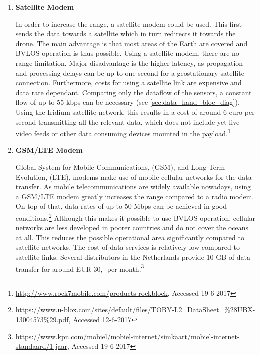 \begin{enumerate}
\item{\textbf{Satellite Modem}}

In order to increase the range, a satellite modem could be used. This first sends the data towards a satellite which in turn redirects it towards the drone. The main advantage is that most areas of the Earth are covered and BVLOS operation is thus possible. Using a satellite modem, there are no range limitation. Major disadvantage is the  higher latency, as propagation and processing delays can be up to one second for a geostationary satellite connection. Furthermore, costs for using a satellite link are expensive and data rate dependant. Comparing only the dataflow of the sensors, a constant flow of up to 55 kbps can be necessary (see \autoref{sec:data_hand_bloc_diag}). Using the Iridium satellite network, this results in a cost of around 6 euro per second transmitting all the relevant data, which does not include yet live video feeds or other data consuming devices mounted in the payload.\footnote{\url{http://www.rock7mobile.com/products-rockblock}, Accessed 19-6-2017}

\item{\textbf{GSM/LTE Modem}}

Global System for Mobile Communications, (GSM), and Long Term Evolution, (LTE), modems make use of mobile cellular networks for the data transfer. As mobile telecommunications are widely available nowadays, using a GSM/LTE modem greatly increases the range compared to a radio modem. On top of that, data rates of up to 50 Mbps can be achieved in good conditions.\footnote{\url{https://www.u-blox.com/sites/default/files/TOBY-L2_DataSheet_\%28UBX-13004573\%29.pdf}, Accessed 12-6-2017} Although this makes it possible to use BVLOS operation, cellular networks are less developed in poorer countries and do not cover the oceans at all. This reduces the possible operational area significantly compared to satellite networks. The cost of data services is relatively low compared to satellite links. Several distributors in the Netherlands provide 10 GB of data transfer for around EUR 30,- per month.\footnote{\url{https://www.kpn.com/mobiel/mobiel-internet/simkaart/mobiel-internet-standaard/1-jaar}, Accessed 19-6-2017} 
\end{enumerate}
